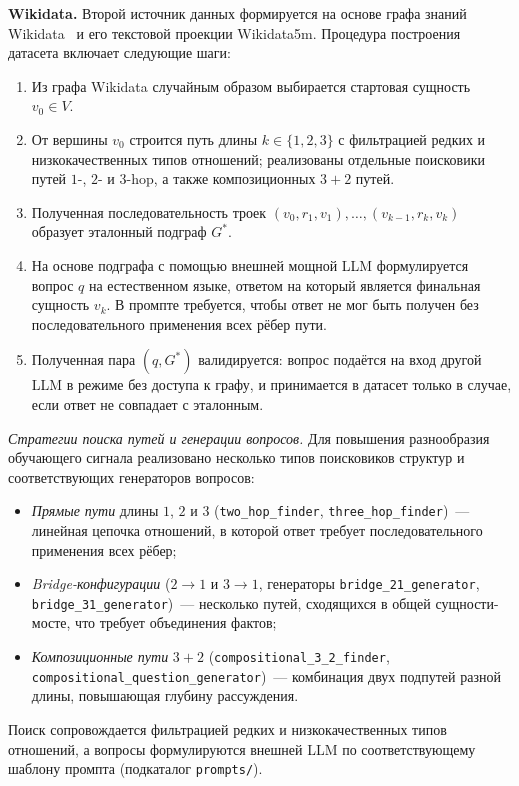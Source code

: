 \textbf{Wikidata.} Второй источник данных формируется на основе графа знаний Wikidata~\cite{vrandecic2014wikidata} и его текстовой проекции Wikidata5m. Процедура построения датасета включает следующие шаги:
\begin{enumerate}
    \setlength{\itemsep}{\smallskipamount}
    \item Из графа Wikidata случайным образом выбирается стартовая сущность $v_0 \in V$.
    \item От вершины $v_0$ строится путь длины $k \in \{1, 2, 3\}$ с фильтрацией редких и низкокачественных типов отношений; реализованы отдельные поисковики путей $1$-, $2$- и $3$-hop, а также композиционных $3{+}2$ путей.
    \item Полученная последовательность троек $(v_0, r_1, v_1), \ldots, (v_{k-1}, r_k, v_k)$ образует эталонный подграф $G^*$.
    \item На основе подграфа с помощью внешней мощной LLM формулируется вопрос $q$ на естественном языке, ответом на который является финальная сущность $v_k$. В промпте требуется, чтобы ответ не мог быть получен без последовательного применения всех рёбер пути.
    \item Полученная пара $(q, G^*)$ валидируется: вопрос подаётся на вход другой LLM в режиме без доступа к графу, и принимается в датасет только в случае, если ответ не совпадает с эталонным.
\end{enumerate}

\textit{Стратегии поиска путей и генерации вопросов.} Для повышения разнообразия обучающего сигнала реализовано несколько типов поисковиков структур и соответствующих генераторов вопросов:
\begin{itemize}
    \setlength{\itemsep}{\smallskipamount}
    \item \textit{Прямые пути} длины $1$, $2$ и $3$ (\texttt{two\_hop\_finder}, \texttt{three\_hop\_finder})~--- линейная цепочка отношений, в которой ответ требует последовательного применения всех рёбер;
    \item \textit{Bridge-конфигурации} ($2{\to}1$ и $3{\to}1$, генераторы \texttt{bridge\_21\_generator}, \texttt{bridge\_31\_generator})~--- несколько путей, сходящихся в общей сущности-мосте, что требует объединения фактов;
    \item \textit{Композиционные пути} $3{+}2$ (\texttt{compositional\_3\_2\_finder}, \texttt{compositional\_question\_generator})~--- комбинация двух подпутей разной длины, повышающая глубину рассуждения.
\end{itemize}
Поиск сопровождается фильтрацией редких и низкокачественных типов отношений, а вопросы формулируются внешней LLM по соответствующему шаблону промпта (подкаталог \texttt{prompts/}).

